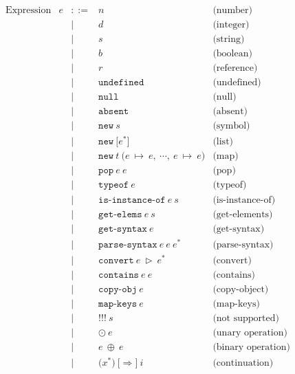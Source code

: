 \documentclass[11pt]{article}
\newcommand{\Term}[1]{\texttt{#1}}
\begin{document}
\[
\begin{array}{rrrll}
\text{Expression} & e & ::= & n & \text{(number)}\\
&&|& d & \text{(integer)}\\
&&|& s & \text{(string)}\\
&&|& b & \text{(boolean)}\\
&&|& r & \text{(reference)}\\
&&|& \Term{undefined} & \text{(undefined)}\\
&&|& \Term{null} & \text{(null)}\\
&&|& \Term{absent} & \text{(absent)}\\
&&|& \Term{new}\ s & \text{(symbol)}\\ %
&&|& \Term{new}\ \Term{[} e^* \Term{]} & \text{(list)}\\ %
&&|& \Term{new}\ t\ \Term{(} e\ \mapsto\ e,\ \cdots,\
e\ \mapsto\ e \Term{)} & \text{(map)}\\ %
&&|& \Term{pop}\ e\ e & \text{(pop)}\\
&&|& \Term{typeof}\ e & \text{(typeof)}\\
&&|& \Term{is-instance-of}\ e\ s& \text{(is-instance-of)}\\
&&|& \Term{get-elems}\ e\ s& \text{(get-elements)}\\
&&|& \Term{get-syntax}\ e& \text{(get-syntax)}\\
&&|& \Term{parse-syntax}\ e\ e\ e^*\ & \text{(parse-syntax)}\\
&&|& \Term{convert}\ e\ \triangleright\ e^*& \text{(convert)}\\
&&|& \Term{contains}\ e\ e& \text{(contains)}\\
&&|& \Term{copy-obj}\ e& \text{(copy-object)}\\
&&|& \Term{map-keys}\ e& \text{(map-keys)}\\
&&|& \Term{!!!}\ s& \text{(not supported)}\\
&&|& \odot\ e& \text{(unary operation)}\\ %
&&|& e\ \oplus\ e& \text{(binary operation)}\\ %
&&|& \Term{(} x^* \Term{)}\ \Term{[} \Rightarrow \Term{]}\ i
& \text{(continuation)}\\ %
\\

\end{array}
\]

\newpage
\end{document}
